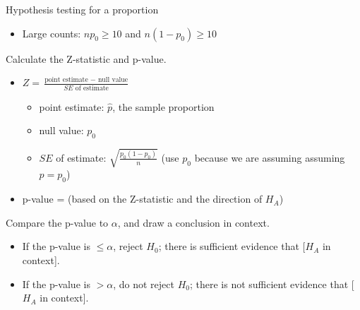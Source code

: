 \begin{onebox}{Hypothesis testing for a proportion}
{\begin{itemize}
\item[2.] Large counts:  $np_0\ge 10$ and $n(1-p_0)\ge 10$
\end{itemize}
}
  Calculate the Z-statistic and p-value.
\begin{itemize}
\item[] $Z = \frac{\text{point estimate } - \text{ null value}}{SE \text{ of estimate}}$
\begin{itemize}
\item[] point estimate: $\hat{p}$, the sample proportion 
\item[] null value: $p_0$
\item[] $SE$ of estimate: $\sqrt{\frac{ p_0(1-p_0) }{n}}$ (use $p_0$ because we are assuming assuming $p=p_0$)
\end{itemize}
\item[] p-value = (based on the Z-statistic and the direction of $H_A$)
\end{itemize}
  Compare the p-value to $\alpha$, and draw a conclusion in context.  \vspace{-1mm}
\begin{itemize}
\item[] If the p-value is $\le \alpha$, reject $H_0$; there is sufficient evidence that [$H_A$ in context]. 
\item[] If the p-value is $> \alpha$, do not reject $H_0$; there is not sufficient evidence that [$H_A$ in context].
\end{itemize}\end{onebox}


